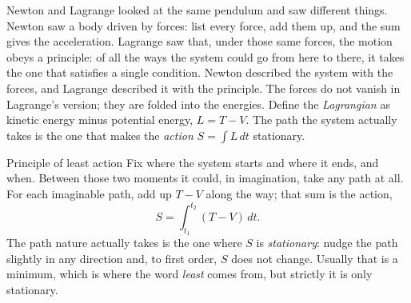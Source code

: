 Newton and Lagrange looked at the same pendulum and saw different things. Newton saw a
body driven by forces: list every force, add them up, and the sum gives the
acceleration. Lagrange saw that, under those same forces, the motion obeys a
principle: of all the ways the system could go from here to there, it takes the one
that satisfies a single condition. Newton described the system with the forces, and
Lagrange described it with the principle. The forces do not vanish in Lagrange's
version; they are folded into the energies. Define the \emph{Lagrangian} as kinetic
energy minus potential energy, $L = T - V$. The path the system actually takes is
the one that makes the \emph{action} $S = \int L\,dt$ stationary.

\begin{concept}{Principle of least action}
Fix where the system starts and where it ends, and when. Between those two moments it
could, in imagination, take any path at all. For each imaginable path, add up $T - V$
along the way; that sum is the action,
\[
  S = \int_{t_1}^{t_2} (T - V)\,dt .
\]
The path nature actually takes is the one where $S$ is \emph{stationary}: nudge the
path slightly in any direction and, to first order, $S$ does not change. Usually that
is a minimum, which is where the word \emph{least} comes from, but strictly it is only
stationary.

\begin{center}
\end{center}


\end{concept}
